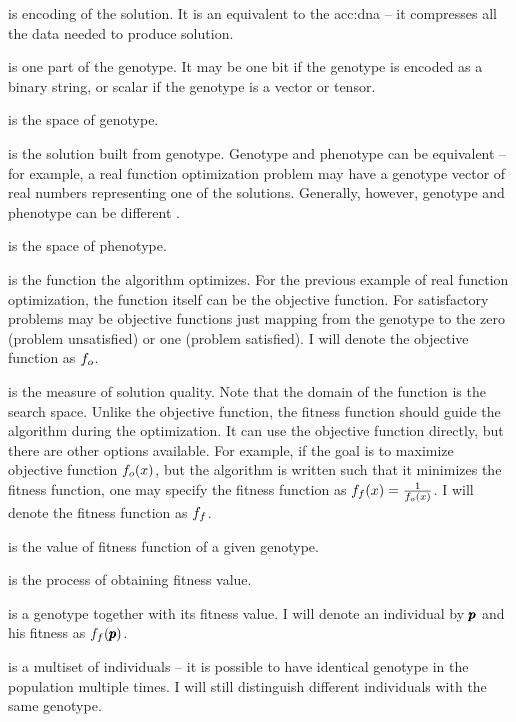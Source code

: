  is encoding of the solution. It is an equivalent to the \acrshort{acc:dna} -- it compresses all the data needed to produce solution.

 is one part of the genotype. It may be one bit if the genotype is encoded as a binary string, or scalar if the genotype is a vector or tensor. 

 is the space of genotype.

 is the solution built from genotype. Genotype and phenotype can be equivalent -- for example, a real function optimization problem may have a genotype vector of real numbers representing one of the solutions. Generally, however, genotype and phenotype can be different \citep{GeneticAlgorithmEssentials}.

 is the space of phenotype.

 is the function the algorithm optimizes. For the previous example of real function optimization, the function itself can be the objective function. For satisfactory problems may be objective functions just mapping from the genotype to the zero (problem unsatisfied) or one (problem satisfied). I will denote the objective function as $f_o$.

 is the measure of solution quality. Note that the domain of the function is the search space. Unlike the objective function, the fitness function should guide the algorithm during the optimization. It can use the objective function directly, but there are other options available. For example, if the goal is to maximize objective function $f_o(x)$, but the algorithm is written such that it minimizes the fitness function, one may specify the fitness function as $f_f(x)=\frac{1}{f_o(x)}$. I will denote the fitness function as $f_f$.

 is the value of fitness function of a given genotype. 

 is the process of obtaining fitness value.

 is a genotype together with its fitness value. I will denote an individual by $\pmb{p}$ and his fitness as $f_f(\pmb{p})$.

 is a multiset of individuals -- it is possible to have identical genotype in the population multiple times. I will still distinguish different individuals with the same genotype.

